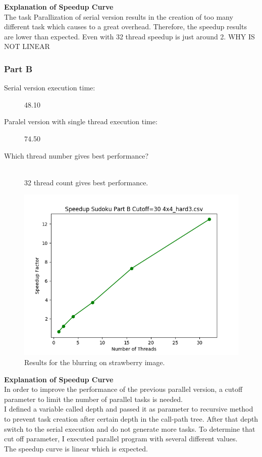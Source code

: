 \documentclass{article}
\newcommand\tab[1][0.5cm]{\hspace*{#1}}
\begin{document}
\textbf{Explanation of Speedup Curve}\\
\tab The task Parallization of serial version results in the creation of too many different task
which causes to a great overhead.
Therefore, the speedup results are lower than expected. Even with 32 thread speedup is just around 2.
\tab WHY IS NOT LINEAR
\newpage

\subsubsection{Part B}

\begin{description}
\item[Serial version execution time: ] 48.10
\item[Paralel version with single thread execution time: ] 74.50
\item[Which thread number gives best performance?]\hfill \\
32 thread count gives best performance.

\end{description} 
\begin{figure}[!htb]
        \centering
        \includegraphics[width=1\linewidth]{./img/speedup_part_2_B.png}
        \caption{Results for the blurring on strawberry image.}
\end{figure}
\textbf{Explanation of Speedup Curve}\\
\tab In order to improve the performance of the previous parallel version, a cutoff parameter 
to limit the number of parallel tasks is needed.\\
\tab I defined a variable called depth and passed it as parameter to recursive method  
to prevent task creation after certain depth in the call-path tree. 
After that depth switch to the serial execution and do not generate more tasks.
To determine that cut off parameter, I executed parallel program with several
different values.\\
\tab The speedup curve is linear which is expected.  
\end{document}
